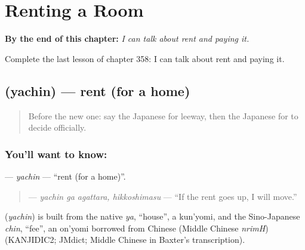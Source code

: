 
\chapter{Renting a Room}
\label{ch:ja-renting-a-room}

\begin{chapteropening}
\textbf{By the end of this chapter:} \emph{I can talk about rent and paying it.}

Complete the last lesson of chapter 358: I can talk about rent and paying it.
\end{chapteropening}

\section[\texorpdfstring{\ja{やちん} (yachin)}{やちん (yachin)}]{ (yachin) — rent (for a home)}

\label{lesson:JA-C358-yachin}



\begin{quote}
Before the new one: say the Japanese for leeway, then the Japanese for to decide officially.
\end{quote}

\subsection*{You'll want to know: }
\textbf{} — \emph{yachin} — \textquotedblleft{}rent (for a home)\textquotedblright{}.

\begin{quote}
\textbf{ } — \emph{yachin ga agattara, hikkoshimasu} — \textquotedblleft{}If the rent goes up, I will move.\textquotedblright{}
\end{quote}

\begin{cousinweb}
\textbf{} (\emph{yachin}) is built from the native \emph{ya}, \textquotedblleft{}house\textquotedblright{}, a kun'yomi, and the Sino-Japanese \emph{chin}, \textquotedblleft{}fee\textquotedblright{}, an on'yomi borrowed from Chinese (Middle Chinese \emph{nrimH}) (KANJIDIC2; JMdict; Middle Chinese in Baxter's transcription).
\end{cousinweb}

